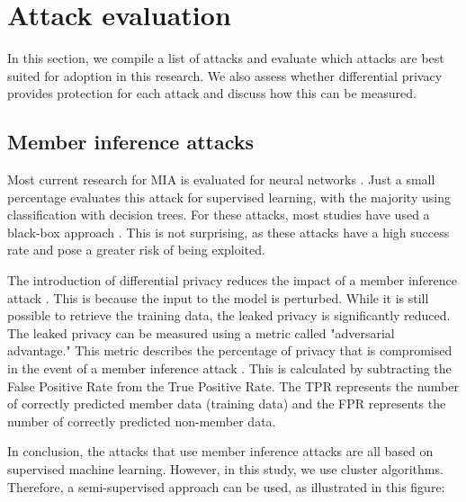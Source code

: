 



\section{Attack evaluation} \label{theory:attack-evaluation}
In this section, we compile a list of attacks and evaluate which attacks are best suited for adoption in this research.
We also assess whether differential privacy provides protection for each attack and discuss how this can be measured.
\subsection{Member inference attacks}
Most current research for MIA is evaluated for neural networks \citep{rigaki_survey_2021}.
Just a small percentage evaluates this attack for supervised learning, with the majority using classification with decision trees.
For these attacks, most studies have used a black-box approach \citep{rigaki_survey_2021}.
This is not surprising, as these attacks have a high success rate and pose a greater risk of being exploited.

The introduction of differential privacy reduces the impact of a member inference attack \citep{rigaki_survey_2021,hu_membership_2022}.
This is because the input to the model is perturbed. While it is still possible to retrieve the training data, the leaked privacy is significantly reduced.
The leaked privacy can be measured using a metric called "adversarial advantage." This metric describes the percentage of privacy that is compromised in the event of a member inference attack \citep{yeom_privacy_2018}.
This is calculated by subtracting the False Positive Rate from the True Positive Rate. The TPR represents the number of correctly predicted member data (training data) and the FPR represents the number of correctly predicted non-member data. \newline
{}

In conclusion, the attacks that use member inference attacks are all based on supervised machine learning.
However, in this study, we use cluster algorithms.
Therefore, a semi-supervised approach can be used, as illustrated in this figure:

